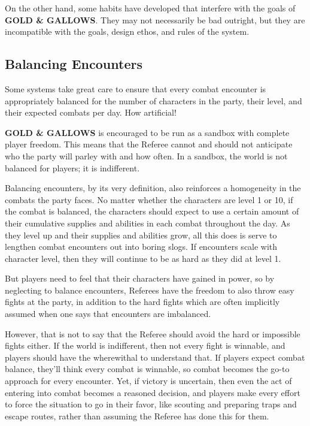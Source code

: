\documentclass[twoside]{article}
\begin{document}
On the other hand, some habits have developed that interfere with the goals of \textbf{GOLD \& GALLOWS}. They may not necessarily be bad outright, but they are incompatible with the goals, design ethos, and rules of the system.

\subsection*{Balancing Encounters}

Some systems take great care to ensure that every combat encounter is appropriately balanced for the number of characters in the party, their level, and their expected combats per day. How artificial!

\bigbreak

\textbf{GOLD \& GALLOWS} is encouraged to be run as a sandbox with complete player freedom. This means that the Referee cannot and should not anticipate who the party will parley with and how often. In a sandbox, the world is not balanced for players; it is indifferent.

\bigbreak

Balancing encounters, by its very definition, also reinforces a homogeneity in the combats the party faces. No matter whether the characters are level 1 or 10, if the combat is balanced, the characters should expect to use a certain amount of their cumulative supplies and abilities in each combat throughout the day. As they level up and their supplies and abilities grow, all this does is serve to lengthen combat encounters out into boring slogs. If encounters scale with character level, then they will continue to be as hard as they did at level 1. 

\bigbreak

But players need to feel that their characters have gained in power, so by neglecting to balance encounters, Referees have the freedom to also throw easy fights at the party, in addition to the hard fights which are often implicitly assumed when one says that encounters are imbalanced. 

\bigbreak

However, that is not to say that the Referee should avoid the hard or impossible fights either. If the world is indifferent, then not every fight is winnable, and players should have the wherewithal to understand that. If players expect combat balance, they'll think every combat is winnable, so combat becomes the go-to approach for every encounter. Yet, if victory is uncertain, then even the act of entering into combat becomes a reasoned decision, and players make every effort to force the situation to go in their favor, like scouting and preparing traps and escape routes, rather than assuming the Referee has done this for them.
\end{document}
